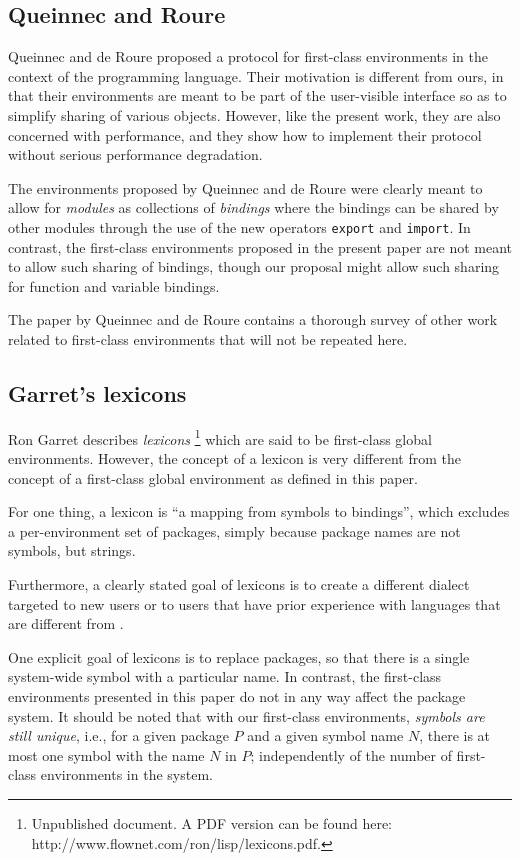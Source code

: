 \subsection{Queinnec and Roure}

Queinnec and de Roure \cite{Queinnec:1996:SCT:232627.232653} proposed
a protocol for first-class environments in the context of the
\scheme{} programming language.  Their motivation is different from
ours, in that their environments are meant to be part of the
user-visible interface so as to simplify sharing of various objects.
However, like the present work, they are also concerned with
performance, and they show how to implement their protocol without
serious performance degradation.

The environments proposed by Queinnec and de Roure were clearly meant
to allow for \emph{modules} as collections of \emph{bindings} where
the bindings can be shared by other modules through the use of the new
operators \texttt{export} and \texttt{import}.  In contrast, the
first-class environments proposed in the present paper are not meant
to allow such sharing of bindings, though our proposal might allow
such sharing for function and variable bindings.

The paper by Queinnec and de Roure contains a thorough survey of other
work related to first-class environments that will not be repeated
here.

\subsection{Garret's lexicons}

Ron Garret describes \emph{lexicons}%
\footnote{Unpublished document.  A PDF version can be found here:
  http://www.flownet.com/ron/lisp/lexicons.pdf.}
which are said to be first-class global environments.  However, the
concept of a lexicon is very different from the concept of a
first-class global environment as defined in this paper.

For one thing, a lexicon is ``a mapping from symbols to bindings'',
which excludes a per-environment set of packages, simply because
package names are not symbols, but strings.

Furthermore, a clearly stated goal of lexicons is to create a
different \lisp{} dialect targeted to new users or to users that have
prior experience with languages that are different from \lisp{}.

One explicit goal of lexicons is to replace \commonlisp{} packages, so
that there is a single system-wide symbol with a particular name.  In
contrast, the first-class environments presented in this paper do not
in any way affect the package system.  It should be noted that with
our first-class environments, \emph{symbols are still unique}, i.e.,
for a given package $P$ and a given symbol name $N$, there is at most
one symbol with the name $N$ in $P$; independently of the number of
first-class environments in the system.

